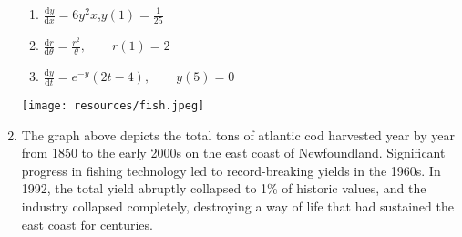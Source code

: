 \begin{enumerate}
\begin{enumerate}
    \item $\frac{\mathrm d y}{\mathrm d x} = 6y^2x$,\qquad $y(1) = \frac{1}{25}$

    \item $\frac{\mathrm d r}{\mathrm d \theta} = \frac{r^2}{\theta},\qquad r(1) = 2 $  

    \item $\frac{\mathrm d y}{\mathrm d t} = e^{-y}(2t-4),\qquad y(5)=0$ 
\end{enumerate}





\clearpage
\centering 
\texttt{[image: resources/fish.jpeg]}

\raggedright 

\item The graph above depicts the total tons of atlantic cod harvested  year by year from 1850 to the early 2000s on the east coast of Newfoundland. Significant progress in fishing technology led to record-breaking yields in the 1960s. In 1992, the total yield abruptly collapsed to 1\% of historic values, and the industry collapsed completely, destroying a way of life that had sustained the east coast for centuries.
\begin{enumerate}


\end{enumerate}
\end{enumerate}
